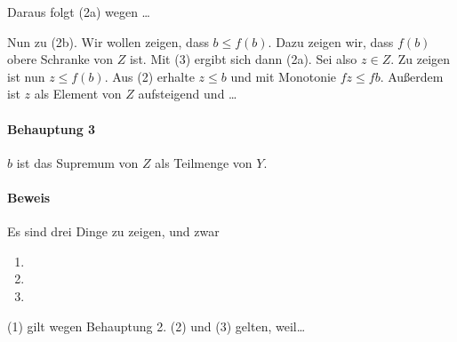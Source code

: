 \documentclass[a4paper,11pt,abstracton]{scrartcl}
\begin{document}
Daraus folgt (2a) wegen …

Nun zu (2b). Wir wollen zeigen, dass $b \leq f(b)$. Dazu zeigen wir, dass $f(b)$ obere Schranke von $Z$ ist. Mit (3) ergibt sich dann (2a). Sei also $z \in Z$. Zu zeigen ist nun $z \leq f(b)$. Aus (2) erhalte $z \leq b$ und mit Monotonie $f z \leq f b$. Außerdem ist $z$ als Element von $Z$ aufsteigend und …
\paragraph{Behauptung 3} $b$ ist das Supremum von $Z$ als Teilmenge von $Y$.
\paragraph{Beweis} Es sind drei Dinge zu zeigen, und zwar
\begin{enumerate}
 \item[(1)]
 \item[(2)]
 \item[(3)]
\end{enumerate}
(1) gilt wegen Behauptung 2. (2) und (3) gelten, weil…
\end{document}
